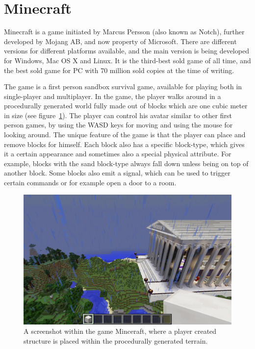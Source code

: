 \documentclass[11pt,twoside]{report} %
\begin{document}
\section{Minecraft}

Minecraft is a game initiated by Marcus Persson (also known as Notch), further developed by Mojang AB, and now property of Microsoft. There are different versions for different platforms available, and the main version is being developed for Windows, Mac OS X and Linux. It is the third-best sold game of all time, and the best sold game for PC with 70 million sold copies at the time of writing.

The game is a first person sandbox survival game, available for playing both in single-player and multiplayer. In the game, the player walks around in a procedurally generated world fully made out of blocks which are one cubic meter in size (see figure~\ref{fig:screenshot}). The player can control his avatar similar to other first person games, by using the WASD keys for moving and using the mouse for looking around. The unique feature of the game is that the player can place and remove blocks for himself. Each block also has a specific block-type, which gives it a certain appearance and sometimes also a special physical attribute. For example, blocks with the sand block-type always fall down unless being on top of another block. Some blocks also emit a signal, which can be used to trigger certain commands or for example open a door to a room.

\begin{figure}[h]
\centering
\includegraphics[width=\textwidth]{screenshot}
\caption{A screenshot within the game Minceraft, where a player created structure is placed within the procedurally generated terrain.\label{fig:screenshot}}
\end{figure}
\end{document}

